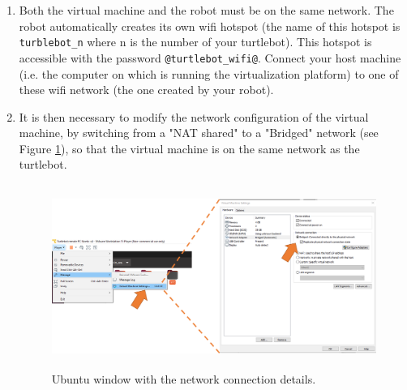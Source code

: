 \documentclass[10pt,a4paper,printanswers]{upmc}
\begin{document}
\begin{enumerate}
  \item Both the virtual machine and the robot must be on the same network. The robot automatically
        creates its own wifi hotspot (the name of this hotspot is \texttt{turblebot\_n} where n is
        the number of your turtlebot). This hotspot is accessible with the password
        \texttt{@turtlebot\_wifi@}. Connect your host machine (i.e. the computer on which is running
        the virtualization platform) to one of these wifi network (the one created by your robot).
  \item It is then necessary to modify the network configuration of the virtual machine, by
        switching from a "NAT shared" to a "Bridged" network (see Figure \ref{fig:bridged}), so that
        the virtual machine is on the same network as the turtlebot.
        \begin{figure}[!h]
          \centering\includegraphics[height=6cm]{figures/bridged.png}
          \caption{Ubuntu window with the network connection details.}
          \label{fig:bridged}
        \end{figure}


\end{enumerate}
\end{document}
